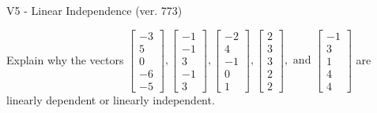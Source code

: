 \begin{exercise}
  \begin{exerciseTitle}V5 - Linear Independence (ver. 773)\end{exerciseTitle}
  \begin{exerciseStatement}
    Explain why the vectors \(\left[\begin{array}{r}
-3 \\
5 \\
0 \\
-6 \\
-5
\end{array}\right] , \left[\begin{array}{r}
-1 \\
-1 \\
3 \\
-1 \\
3
\end{array}\right] , \left[\begin{array}{r}
-2 \\
4 \\
-1 \\
0 \\
1
\end{array}\right] , \left[\begin{array}{r}
2 \\
3 \\
3 \\
2 \\
2
\end{array}\right] , \text{ and } \left[\begin{array}{r}
-1 \\
3 \\
1 \\
4 \\
4
\end{array}\right]\) are linearly dependent or linearly independent.	



\end{exerciseStatement}
\end{exercise}
